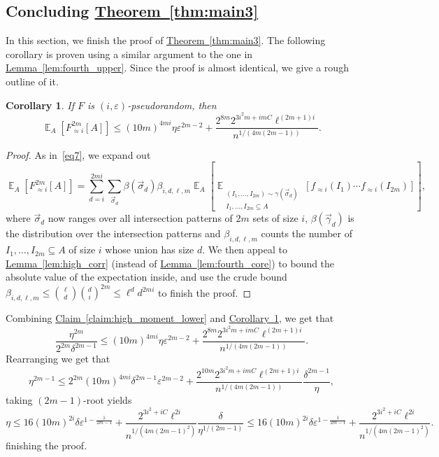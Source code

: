 \documentclass[11pt]{article}
\newcommand{\expref}[2]{\texorpdfstring{\hyperref[#2]{#1~\ref{#2}}}{#1~\ref{#2}}}
\newtheorem{corollary}[theorem]{Corollary}
\newcommand\Expect[2]{{\mathop{\mathbb{E}}_{#1}\left[ {#2} \right]}}
\newcommand\skipi{{\vskip 10pt}}
\newcommand\eps{\varepsilon}
\renewcommand\leq{\leqslant}
\newcommand\approxlvlfn[2]{{#1}_{\approx{#2}}}
\begin{document}
\subsection{Concluding \expref{Theorem}{thm:main3}}
In this section, we finish the proof of \expref{Theorem}{thm:main3}.
The following corollary is proven using a similar argument to the one in \expref{Lemma}{lem:fourth_upper}.
Since the proof is almost identical, we give a rough outline of it.
\begin{corollary}\label{lem:fourth_upper_high}
If $F$ is $(i,\eps)$-pseudorandom, then
\[
\Expect{A}{\approxlvlfn{F}{i}^{2m}[A]}\leq
(10m)^{4mi} \eta\eps^{2m-2}
+\frac{2^{8m}2^{3i^2m+imC} \ell^{(2m+1)i}}{n^{1/(4m(2m-1))}}.
\]
\end{corollary}
\begin{proof}
  As in~\eqref{eq7}, we expand out
  \begin{equation}\label{eq7'}
\Expect{A}{\approxlvlfn{F}{i}^{2m}[A]}%
=
\sum\limits_{d=i}^{2mi}{
\sum\limits_{\vec{\sigma}_d}{
\beta(\vec{\sigma}_d)\beta_{i,d,\ell,m}
\Expect{A}{\Expect{\substack{(I_1,\ldots,I_{2m}) \sim \gamma(\vec{\sigma}_d)\\ I_1,...,I_{2m}\subseteq A}}
{\approxlvlfn{f}{i}(I_1)\cdots\approxlvlfn{f}{i}(I_{2m})
}}}},
\end{equation}
where $\vec{\sigma}_d$ now ranges over all intersection patterns of $2m$ sets of size $i$, $\beta(\vec{\gamma}_d)$ is the distribution over the intersection patterns and
$\beta_{i,d,\ell,m}$ counts the number of $I_1,\ldots,I_{2m}\subseteq A$ of size $i$ whose union has size $d$. We then appeal to
\expref{Lemma}{lem:high_corr} (instead of \expref{Lemma}{lem:fourth_core}) to bound the absolute value of the expectation inside, and use the crude bound
$\beta_{i,d,\ell,m}\leq \binom{\ell}{d}\binom{d}{i}^{2m}\leq \ell^{d} d^{2mi}$ to finish the proof.
\end{proof}

\skipi
Combining \expref{Claim}{claim:high_moment_lower}
and \expref{Corollary}{lem:fourth_upper_high}, we get that
\[
\frac{\eta^{2m}}{2^{2m}\delta^{2m-1}}
\leq (10m)^{4mi}\eta\eps^{2m-2}
+\frac{2^{8m}2^{3i^2m+imC} \ell^{(2m+1)i}}{n^{1/(4m(2m-1))}}.
\]
Rearranging we get that
\[
\eta^{2m-1}\leq 2^{2m}(10m)^{4mi} \delta^{2m-1}\eps^{2m-2}
+\frac{2^{10m}2^{3i^2m+imC} \ell^{(2m+1)i}}{n^{1/(4m(2m-1))}}\frac{\delta^{2m-1}}{\eta},
\]
taking $(2m-1)$-root yields
\[
\eta\leq 16 (10m)^{2i}\delta\eps^{1-\frac{1}{2m-1}}
+\frac{2^{3i^2+iC}\ell^{2i}}{n^{1/(4m(2m-1)^2)}}\frac{\delta}{\eta^{1/(2m-1)}}
\leq 16 (10m)^{2i}\delta\eps^{1-\frac{1}{2m-1}}
+\frac{2^{3i^2+iC}\ell^{2i}}{n^{1/(4m(2m-1)^2)}}.
\]
finishing the proof.   %
%
%
\end{document}
